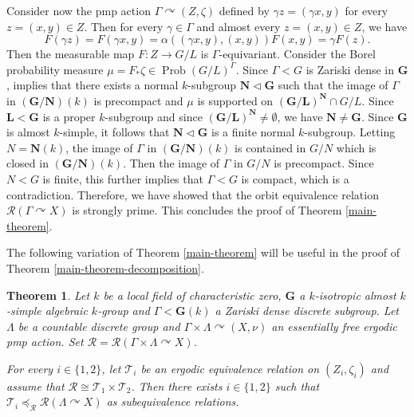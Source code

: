 \documentclass[11pt]{amsart}
\numberwithin{equation}{section}
\theoremstyle{plain}
\newtheorem{thm}{Theorem}[section]
\theoremstyle{definition}
\newcommand{\Prob}{\operatorname{Prob}}
\begin{document}
Consider now the pmp action $\Gamma \curvearrowright (Z, \zeta)$ defined by $\gamma z = (\gamma x, y)$ for every $z = (x, y) \in Z$. Then for every $\gamma \in \Gamma$ and almost every $z = (x, y) \in Z$, we have
$$F(\gamma z) = F(\gamma x, y) = \alpha((\gamma x, y), (x,y)) F(x, y) = \gamma F(z).$$
Then the measurable map $F : Z \to G/L$ is $\Gamma$-equivariant. Consider the Borel probability measure $\mu = F_\ast\zeta \in \Prob(G/L)^\Gamma$. Since $\Gamma < G$ is Zariski dense in $\mathbf G$, \cite[Proposition 1.9]{BDL14} implies that there exists a normal $k$-subgroup $\mathbf N \lhd \mathbf G$ such that the image of $\Gamma$ in $(\mathbf G/\mathbf N)(k)$ is precompact and $\mu$ is supported on $(\mathbf G/\mathbf L)^{\mathbf N} \cap G/L$. Since $\mathbf L < \mathbf G$ is a proper $k$-subgroup and since $(\mathbf G/\mathbf L)^{\mathbf N} \neq \emptyset$, we have $\mathbf N \neq \mathbf G$. Since $\mathbf G$ is almost $k$-simple, it follows that $\mathbf N \lhd \mathbf G$ is a finite normal $k$-subgroup. Letting $N = \mathbf N(k)$, the image of $\Gamma$ in $(\mathbf G/\mathbf N)(k)$ is contained in $G/N$ which is closed in $(\mathbf G/\mathbf N)(k)$. Then the image of $\Gamma$ in $G/N$ is precompact. Since $N < G$ is finite, this further implies that $\Gamma < G$ is compact, which is a contradiction. Therefore, we have showed that the orbit equivalence relation $\mathscr R(\Gamma \curvearrowright X)$ is strongly prime. This concludes the proof of Theorem \ref{main-theorem}.


The following variation of Theorem \ref{main-theorem} will be useful in the proof of Theorem \ref{main-theorem-decomposition}.

\begin{thm}\label{thm-analogy}
Let $k$ be a local field of characteristic zero, $\mathbf G$ a $k$-isotropic almost $k$-simple algebraic $k$-group and $\Gamma < \mathbf G(k)$ a Zariski dense discrete subgroup. Let $\Lambda$ be a countable discrete group and $\Gamma \times \Lambda \curvearrowright (X, \nu)$ an essentially free ergodic pmp action. Set $\mathscr R = \mathscr R(\Gamma \times \Lambda \curvearrowright X)$.

For every $i \in \{1, 2\}$, let $\mathscr T_i$ be an ergodic equivalence relation on $(Z_i, \zeta_i)$ and assume that $\mathscr R \cong \mathscr T_1 \times \mathscr T_2$. Then there exists $i \in \{1, 2\}$ such that $\mathscr T_i \preceq_{\mathscr R} \mathscr R(\Lambda \curvearrowright X)$ as subequivalence relations.
\end{thm}
\end{document}
